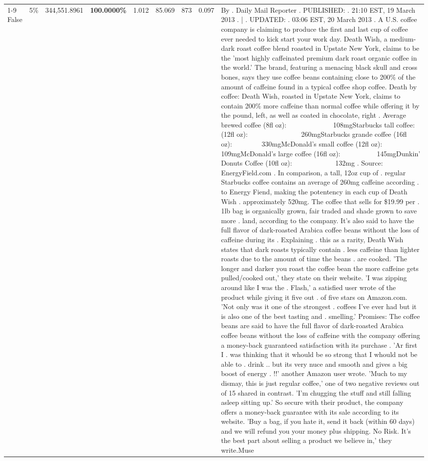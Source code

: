 \begin{table}[H]
{\begin{tabular}{lllrlllll}
\cline{1-9} \cline{2-9}
False & 5\% & 344,551.8961 & \bfseries \color{red} 100.0000\% & 1.012 & 85.069 & 873 & 0.097 & By . Daily Mail Reporter . PUBLISHED: . 21:10 EST, 19 March 2013 . | . UPDATED: . 03:06 EST, 20 March 2013 . A U.S. coffee company is claiming to produce the first and last cup of coffee ever needed to kick start your work day. Death Wish, a medium-dark roast coffee blend roasted in Upstate New York, claims to be the 'most highly caffeinated premium dark roast organic coffee in the world.' The brand, featuring a menacing black skull and cross bones, says they use coffee beans containing close to 200\% of the amount of caffeine found in a typical coffee shop coffee. Death by coffee: Death Wish, roasted in Upstate New York, claims to contain 200\% more caffeine than normal coffee while offering it by the pound, left, as well as coated in chocolate, right . Average brewed coffee (8fl oz):              108mgStarbucks tall coffee: (12fl oz):                260mgStarbucks grande coffee (16fl oz):         330mgMcDonald's small coffee (12fl oz):           109mgMcDonald's large coffee (16fl oz):           145mgDunkin' Donuts Coffee (10fl oz):             132mg . Source: EnergyField.com . In comparison, a tall, 12oz cup of . regular Starbucks coffee contains an average of 260mg caffeine according . to Energy Fiend, making the potentency in each cup of Death Wish . approximately 520mg. The coffee that sells for \$19.99 per . 1lb bag is organically grown, fair traded and shade grown to save more . land, according to the company. It's also said to have the full flavor of dark-roasted Arabica coffee beans without the loss of caffeine during its . Explaining . this as a rarity, Death Wish states that dark roasts typically contain . less caffeine than lighter roasts due to the amount of time the beans . are cooked. 'The longer and darker you roast the coffee bean the more caffeine gets pulled/cooked out,' they state on their website. 'I was zipping around like I was the . Flash,' a satisfied user wrote of the product while giving it five out . of five stars on Amazon.com. 'Not only was it one of the strongest . coffees I've ever had but it is also one of the best tasting and . smelling.’ Promises: The coffee beans are said to have the full flavor of dark-roasted Arabica coffee beans without the loss of caffeine with the company offering a money-back guaranteed satisfaction with its purchase . 'Ar first I . was thinking that it whould be so strong that I whould not be able to . drink .. but its very nuce and smooth and gives a big boost of energy . !!' another Amazon user wrote. 'Much to my dismay, this is just regular coffee,' one of two negative reviews out of 15 shared in contrast. 'I'm chugging the stuff and still falling asleep sitting up.' So secure with their product, the company offers a money-back guarantee with its sale according to its website. 'Buy a bag, if you hate it, send it back (within 60 days) and we will refund you your money plus shipping. No Risk. It’s the best part about selling a product we believe in,' they write.Muse \\

\end{tabular}}
\end{table}
